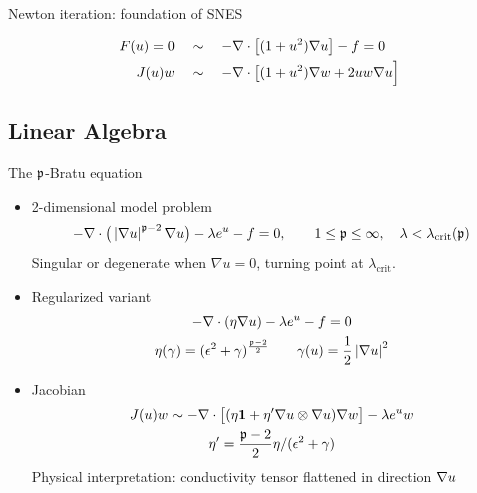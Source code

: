 \begin{frame}{Newton iteration: foundation of SNES}
\begin{example}
\begin{align*}
      F(u)=0 \quad &\sim\quad -\nabla \cdot \big[ (1+u^2) \nabla u \big] - f = 0 \\
      J(u)w \quad &\sim\quad  -\nabla \cdot \big[(1+u^2)\nabla w + 2uw\nabla u \Big]
    \end{align*}
  \end{example}
\end{frame}

\subsection{Linear Algebra}





\begin{frame}{The ${\mathfrak p}$-Bratu equation}
  \begin{itemize}
  \item 2-dimensional model problem
    \begin{equation*}
      -\nabla \cdot \big(\left\lvert \nabla u \right\rvert^{{\mathfrak p}-2} \nabla u \big) - \lambda e^u - f = 0, \qquad 1 \le {\mathfrak p} \le \infty, \quad \lambda < \lambda_{\text{crit}}({\mathfrak p})
    \end{equation*}
    Singular or degenerate when $\nabla u = 0$, turning point at $\lambda_{\text{crit}}$.
  \item Regularized variant
    \begin{gather*}
      -\nabla \cdot (\eta \nabla u) - \lambda e^u - f = 0 \\
      \eta(\gamma) = (\epsilon^2 + \gamma)^{\frac{{\mathfrak p}-2}{2}} \qquad \gamma(u) = {\frac 1 2} \left\lvert \nabla u \right\rvert^2
    \end{gather*}
  \item Jacobian
    \begin{gather*}
      J(u) w \sim -\nabla \cdot \big[ (\eta \bm 1 + \eta' \nabla u \otimes \nabla u) \nabla w \big] - \lambda e^u w \\
      \eta' = \frac{{\mathfrak p}-2}{2} \eta / (\epsilon^2 + \gamma)
    \end{gather*}
    Physical interpretation: conductivity tensor flattened in direction $\nabla u$ %
  \end{itemize}
\end{frame}

